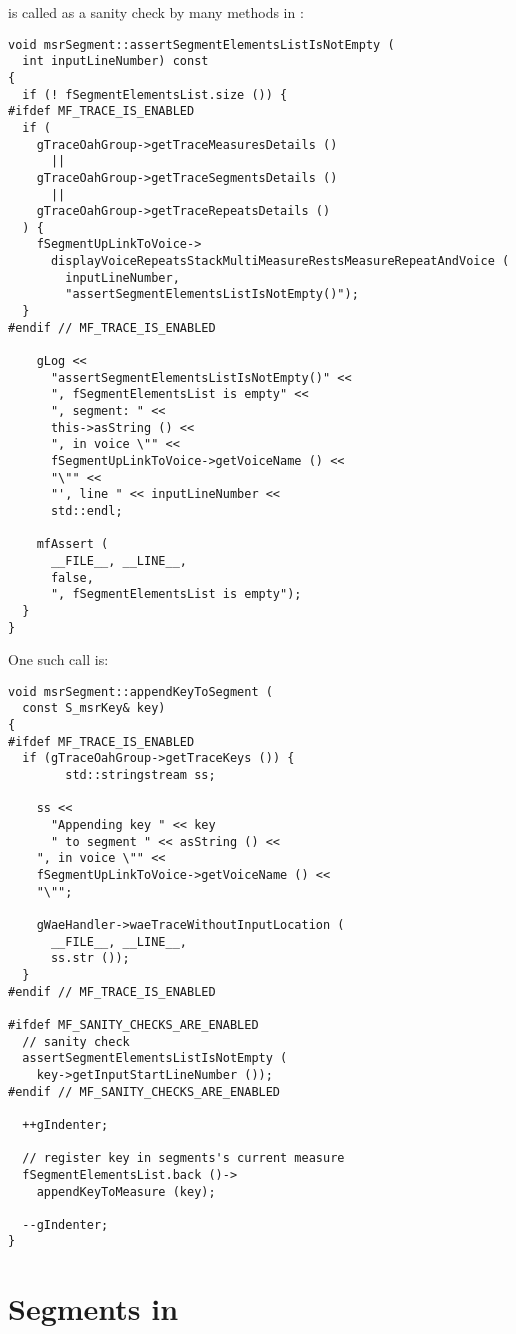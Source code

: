  is called as a sanity check by many methods in :
\begin{lstlisting}[language=CPlusPlus]
void msrSegment::assertSegmentElementsListIsNotEmpty (
  int inputLineNumber) const
{
  if (! fSegmentElementsList.size ()) {
#ifdef MF_TRACE_IS_ENABLED
  if (
    gTraceOahGroup->getTraceMeasuresDetails ()
      ||
    gTraceOahGroup->getTraceSegmentsDetails ()
      ||
    gTraceOahGroup->getTraceRepeatsDetails ()
  ) {
    fSegmentUpLinkToVoice->
      displayVoiceRepeatsStackMultiMeasureRestsMeasureRepeatAndVoice (
        inputLineNumber,
        "assertSegmentElementsListIsNotEmpty()");
  }
#endif // MF_TRACE_IS_ENABLED

    gLog <<
      "assertSegmentElementsListIsNotEmpty()" <<
      ", fSegmentElementsList is empty" <<
      ", segment: " <<
      this->asString () <<
      ", in voice \"" <<
      fSegmentUpLinkToVoice->getVoiceName () <<
      "\"" <<
      "', line " << inputLineNumber <<
      std::endl;

    mfAssert (
      __FILE__, __LINE__,
      false,
      ", fSegmentElementsList is empty");
  }
}
\end{lstlisting}

One such call is:
\begin{lstlisting}[language=CPlusPlus]
void msrSegment::appendKeyToSegment (
  const S_msrKey& key)
{
#ifdef MF_TRACE_IS_ENABLED
  if (gTraceOahGroup->getTraceKeys ()) {
		std::stringstream ss;

    ss <<
      "Appending key " << key
      " to segment " << asString () <<
    ", in voice \"" <<
    fSegmentUpLinkToVoice->getVoiceName () <<
    "\"";

    gWaeHandler->waeTraceWithoutInputLocation (
      __FILE__, __LINE__,
      ss.str ());
  }
#endif // MF_TRACE_IS_ENABLED

#ifdef MF_SANITY_CHECKS_ARE_ENABLED
  // sanity check
  assertSegmentElementsListIsNotEmpty (
    key->getInputStartLineNumber ());
#endif // MF_SANITY_CHECKS_ARE_ENABLED

  ++gIndenter;

  // register key in segments's current measure
  fSegmentElementsList.back ()->
    appendKeyToMeasure (key);

  --gIndenter;
}
\end{lstlisting}


\section{Segments in \mxsrToMsr{}}

